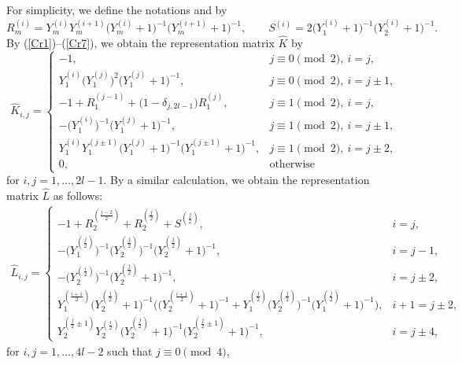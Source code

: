 \documentclass[pdftex]{sigma}
\numberwithin{equation}{section}
\begin{document}
For simplicity, we define the notations  and  by
	\[R_m^{(i)}=Y_m^{(i)}Y_m^{(i+1)}\bigl(Y_m^{(i)}+1\bigr)^{-1}\bigl(Y_m^{(i+1)}+1\bigr)^{-1},\qquad S^{(i)}=2\bigl(Y_1^{(i)}+1\bigr)^{-1}\bigl(Y_2^{(i)}+1\bigr)^{-1}.\]
By (\ref{Cr1})--(\ref{Cr7}), we obtain the representation matrix $\hat{K}$ by
	\[\hat{K}_{i,j}=\begin{cases}
		-1,& j\equiv0\pmod{2},\ i=j, \\
		Y_1^{(i)}\bigl(Y_1^{(j)}\bigr)^2\bigl(Y_1^{(j)}+1\bigr)^{-1},& j\equiv0\pmod{2},\ i=j\pm1, \\
		-1+R_1^{(j-1)}+\bigl(1-\delta_{j,2l-1}\bigr)R_1^{(j)},& j\equiv1\pmod{2},\ i=j, \\
		-\bigl(Y_1^{(i)}\bigr)^{-1}\bigl(Y_1^{(j)}+1\bigr)^{-1},& j\equiv1\pmod{2},\ i=j\pm1, \\
		Y_1^{(i)}Y_1^{(j\pm1)}\bigl(Y_1^{(j)}+1\bigr)^{-1}\bigl(Y_1^{(j\pm1)}+1\bigr)^{-1},& j\equiv1\pmod{2},\ i=j\pm2,\\
		0,& \text{otherwise}
	\end{cases}\]
for $i,j=1,\dots,2l-1$.
By a similar calculation, we obtain the representation matrix $\hat{L}$ as follows:
	\begin{gather*}
 \hat{L}_{i,j}=\begin{cases}
		-1+R_2^{(\frac{j-2}{2})}+R_2^{(\frac{j}{2})}+S^{(\frac{j}{2})},& i=j,\\
		-\bigl(Y_1^{(\frac{j}{2})}\bigr)^{-1}\bigl(Y_2^{(\frac{j}{2})}\bigr)^{-1}\bigl(Y_2^{(\frac{j}{2})}+1\bigr)^{-1},& i=j-1,\\
		-\bigl(Y_2^{(\frac{i}{2})}\bigr)^{-1}\bigl(Y_2^{(\frac{j}{2})}+1\bigr)^{-1},& i=j\pm2,\\ Y_1^{(\frac{i+1}{2})}\bigl(Y_2^{(\frac{j}{2})}\!+1\bigr)^{-1}\bigl(\bigl(Y_2^{(\frac{i+1}{2})}\!+1\bigr)^{-1}+ Y_1^{(\frac{j}{2})}\bigl(Y_2^{(\frac{j}{2})}\bigr)^{-1}\bigl(Y_1^{(\frac{j}{2})}\!+1\bigr)^{-1}\bigr),\!& i+1=j\pm2,\\
		Y_2^{(\frac{j}{2}\pm1)}Y_2^{(\frac{i}{2})}\bigl(Y_2^{(\frac{j}{2})}+1\bigr)^{-1}\bigl(Y_2^{(\frac{j}{2}\pm1)}+1\bigr)^{-1},& i=j\pm4,
	\end{cases}
 \end{gather*}
for $i,j=1,\dots,4l-2$ such that $j\equiv0\pmod{4}$,
\end{document}
